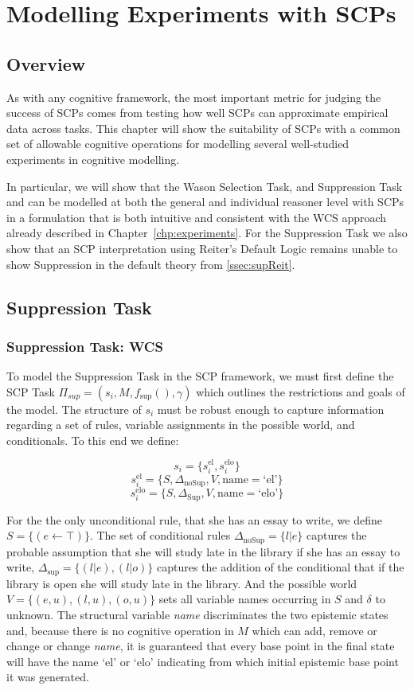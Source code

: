 \chapter{Modelling Experiments with SCPs} \label{chp:model}
\section{Overview}
As with any cognitive framework, the most important metric for judging the success of SCPs comes from testing how well SCPs can approximate empirical data across tasks. This chapter will show the suitability of SCPs with a common set of allowable cognitive operations for modelling several well-studied experiments in cognitive modelling.

In particular, we will show that the Wason Selection Task, and Suppression Task and can be modelled at both the general and individual reasoner level with SCPs in a formulation that is both intuitive and consistent with the WCS approach already described in Chapter~\ref{chp:experiments}. For the Suppression Task we also show that an SCP interpretation using Reiter's Default Logic remains unable to show Suppression in the default theory from \ref{ssec:supReit}.

\section{Suppression Task} \label{sec:supSCP}

\subsection{Suppression Task: WCS}


To model the Suppression Task in the SCP framework, we must first define the SCP Task $\Pi_{sup}=(s_i,M,f_\text{sup}(),\gamma)$ which outlines the restrictions and goals of the model. The structure of $s_i$ must be robust enough to capture information regarding a set of rules, variable assignments in the possible world, and conditionals. To this end we define:

\[s_i=\{s_i^\text{el},s_i^\text{elo}\}\]
\[s_i^\text{el}=\{S,\Delta_\text{noSup}, V, \text{name}=\text{`el'}\} \]
\[s_i^\text{elo}=\{S,\Delta_\text{Sup}, V, \text{name}=\text{`elo'}\} \]




For the the only unconditional rule, that she has an essay to write, we define $S=\{(e \leftarrow \top)\}$. The set of conditional rules $\Delta_{\text{noSup}}=\{l|e\}$ captures the probable assumption that she will study late in the library if she has an essay to write, $\Delta_{\text{sup}}=\{(l|e),(l|o)\}$ captures the addition of the conditional that if the library is open she will study late in the library. And the possible world $V=\{(e,u),(l,u),(o,u)\}$ sets all variable names occurring in $S$ and $\delta$ to unknown. The structural variable \textit{name} discriminates the two epistemic states and, because there is no cognitive operation in $M$ which can add, remove or change or change \textit{name}, it is guaranteed that every base point in the final state will have the name `el' or `elo' indicating from which initial epistemic base point it was generated.

